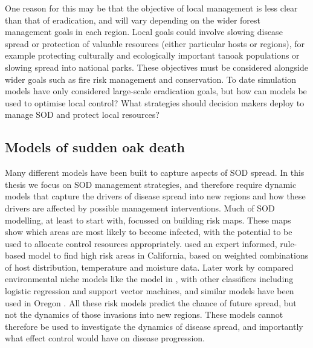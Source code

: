 One reason for this may be that the objective of local management is less clear than that of eradication, and will vary depending on the wider forest management goals in each region. Local goals could involve slowing disease spread or protection of valuable resources (either particular hosts or regions), for example protecting culturally and ecologically important tanoak populations or slowing spread into national parks. These objectives must be considered alongside wider goals such as fire risk management and conservation. To date simulation models have only considered large-scale eradication goals, but how can models be used to optimise local control? What strategies should decision makers deploy to manage SOD and protect local resources?

\subsection{Models of sudden oak death}\label{sec:ch1:sod_models}

Many different models have been built to capture aspects of SOD spread. In this thesis we focus on SOD management strategies, and therefore require dynamic models that capture the drivers of disease spread into new regions and how these drivers are affected by possible management interventions. Much of SOD modelling, at least to start with, focussed on building risk maps. These maps show which areas are most likely to become infected, with the potential to be used to allocate control resources appropriately. \citet{meentemeyer_mapping_2004} used an expert informed, rule-based model to find high risk areas in California, based on weighted combinations of host distribution, temperature and moisture data. Later work by \citet{kelly_modeling_2007} compared environmental niche models like the model in \citet{meentemeyer_mapping_2004}, with other classifiers including logistic regression and support vector machines, and similar models have been used in Oregon \citep{vaclavik_mapping_2010}. All these risk models predict the chance of future spread, but not the dynamics of those invasions into new regions. These models cannot therefore be used to investigate the dynamics of disease spread, and importantly what effect control would have on disease progression.


